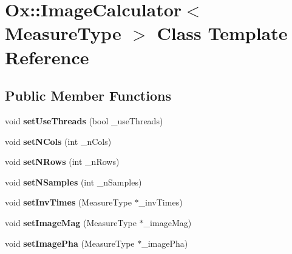 \hypertarget{class_ox_1_1_image_calculator}{\section{Ox\-:\-:Image\-Calculator$<$ Measure\-Type $>$ Class Template Reference}
\label{class_ox_1_1_image_calculator}
}
\subsection*{Public Member Functions}
\begin{DoxyCompactItemize}
\item 
\hypertarget{class_ox_1_1_image_calculator_a7be88cf7363fd80c9e15f45a7c1ec2f9}{void {\bfseries set\-Use\-Threads} (bool \-\_\-use\-Threads)}\label{class_ox_1_1_image_calculator_a7be88cf7363fd80c9e15f45a7c1ec2f9}

\item 
\hypertarget{class_ox_1_1_image_calculator_a7a8e99362b52f4e5b81883ba73095347}{void {\bfseries set\-N\-Cols} (int \-\_\-n\-Cols)}\label{class_ox_1_1_image_calculator_a7a8e99362b52f4e5b81883ba73095347}

\item 
\hypertarget{class_ox_1_1_image_calculator_ab3990b041e3bba8dc8d291e6d5e0620c}{void {\bfseries set\-N\-Rows} (int \-\_\-n\-Rows)}\label{class_ox_1_1_image_calculator_ab3990b041e3bba8dc8d291e6d5e0620c}

\item 
\hypertarget{class_ox_1_1_image_calculator_afb20deb27b05d3adc6d632f507c1a96f}{void {\bfseries set\-N\-Samples} (int \-\_\-n\-Samples)}\label{class_ox_1_1_image_calculator_afb20deb27b05d3adc6d632f507c1a96f}

\item 
\hypertarget{class_ox_1_1_image_calculator_aaf2ce9f3ab41ca0f5011a250781626d3}{void {\bfseries set\-Inv\-Times} (Measure\-Type $\ast$\-\_\-inv\-Times)}\label{class_ox_1_1_image_calculator_aaf2ce9f3ab41ca0f5011a250781626d3}

\item 
\hypertarget{class_ox_1_1_image_calculator_aa56e3a3804d8dda0e34438c49a77aa67}{void {\bfseries set\-Image\-Mag} (Measure\-Type $\ast$\-\_\-image\-Mag)}\label{class_ox_1_1_image_calculator_aa56e3a3804d8dda0e34438c49a77aa67}

\item 
\hypertarget{class_ox_1_1_image_calculator_a950ee11b635bc4b86fb32f85f647562d}{void {\bfseries set\-Image\-Pha} (Measure\-Type $\ast$\-\_\-image\-Pha)}\label{class_ox_1_1_image_calculator_a950ee11b635bc4b86fb32f85f647562d}


\end{DoxyCompactItemize}
